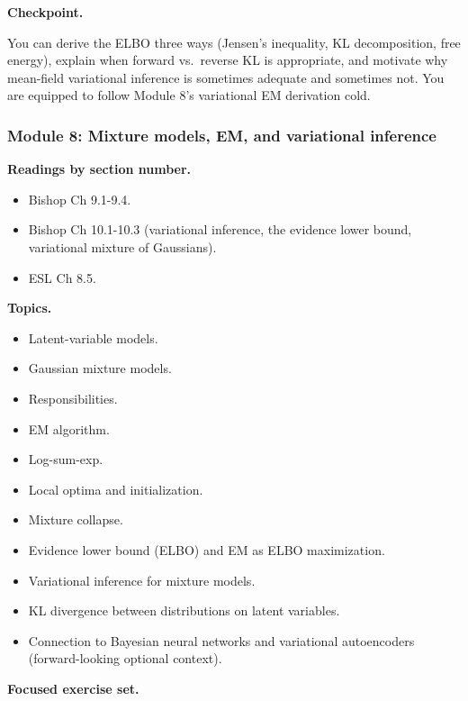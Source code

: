 \textbf{Checkpoint.}

You can derive the ELBO three ways (Jensen's inequality, KL
decomposition, free energy), explain when forward vs.~reverse KL is
appropriate, and motivate why mean-field variational inference is
sometimes adequate and sometimes not. You are equipped to follow Module
8's variational EM derivation cold.

\subsubsection{Module 8: Mixture models, EM, and variational
inference}\label{module-8-mixture-models-em-and-variational-inference}

\textbf{Readings by section number.}

\begin{itemize}
\tightlist
\item
  Bishop Ch 9.1-9.4.
\item
  Bishop Ch 10.1-10.3 (variational inference, the evidence lower bound,
  variational mixture of Gaussians).
\item
  ESL Ch 8.5.
\end{itemize}

\textbf{Topics.}

\begin{itemize}
\tightlist
\item
  Latent-variable models.
\item
  Gaussian mixture models.
\item
  Responsibilities.
\item
  EM algorithm.
\item
  Log-sum-exp.
\item
  Local optima and initialization.
\item
  Mixture collapse.
\item
  Evidence lower bound (ELBO) and EM as ELBO maximization.
\item
  Variational inference for mixture models.
\item
  KL divergence between distributions on latent variables.
\item
  Connection to Bayesian neural networks and variational autoencoders
  (forward-looking optional context).
\end{itemize}

\textbf{Focused exercise set.}

